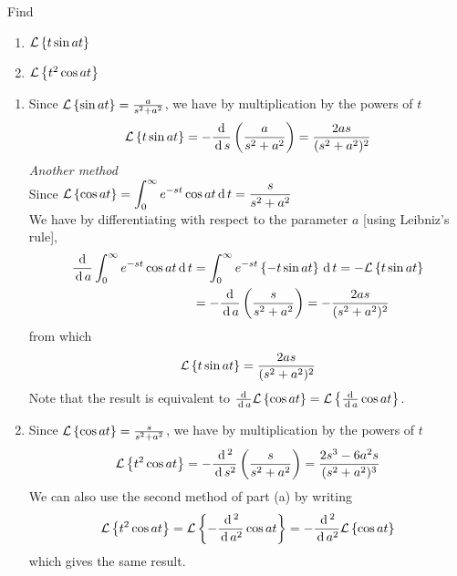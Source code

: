\documentclass[../main-sheet.tex]{subfiles}
\begin{document}
\begin{prob}
    Find \begin{enumerate}[label=(\alph*)]
        \item $ \mathcal{L}\left\{ t\sin at\right\} $
        \item $ \mathcal{L}\left\{ t^2 \cos at\right\} $
    \end{enumerate}
\end{prob}
\begin{soln}
    \hfill
    \begin{enumerate}[label=(\alph*)]
        \item Since $ \mathcal{L}\left\{ \sin at\right\}=\frac{a}{s^2+a^2} $, we have by multiplication by the powers of $ t $
        \[
            \mathcal{L}\left\{ t\sin at\right\}=-\frac{\,\mathrm{d}\,}{\,\mathrm{d}\, s}\left( \frac{a}{s^2+a^2} \right)=\frac{2as}{(s^2+a^2)^2}
        \]
        \emph{Another method}\\
        Since $ \displaystyle \mathcal{L}\left\{ \cos at\right\}=\int_0^\infty e^{-st}\cos at \,\mathrm{d}\, t =\frac{s}{s^2+a^2}$\\
        We have by differentiating with respect to the parameter $ a $ [using Leibniz's rule],
        \begin{align*}
            \frac{\,\mathrm{d}\,}{\,\mathrm{d}\, a}\int_0^\infty e^{-st}\cos at\,\mathrm{d}\, t&=\int_0^\infty e^{-st}\left\{-t\sin at\right\}\,\mathrm{d}\, t=-\mathcal{L}\left\{ t\sin at\right\}\\
            &=-\frac{\,\mathrm{d}\,}{\,\mathrm{d}\, a}\left( \frac{s}{s^2+a^2} \right)=-\frac{2as}{(s^2+a^2)^2}
        \end{align*}
        from which 
        \[
            \mathcal{L}\left\{ t\sin at\right\}=\frac{2as}{(s^2+a^2)^2}
        \]
        Note that the result is equivalent to $ \frac{\,\mathrm{d}\,}{\,\mathrm{d}\, a}\mathcal{L}\left\{ \cos at\right\}=\mathcal{L}\left\{ \frac{\,\mathrm{d}\,}{\,\mathrm{d}\, a}\cos at\right\} $.
        \item Since $ \mathcal{L}\left\{ \cos at\right\}=\frac{s}{s^2+a^2} $, we have by multiplication by the powers of $ t $
        \[
            \mathcal{L}\left\{ t^2\cos at\right\}=-\frac{\,\mathrm{d}\,^2}{\,\mathrm{d}\, s^2}\left( \frac{s}{s^2+a^2} \right)=\frac{2s^3-6a^2s}{(s^2+a^2)^3}
        \]
        We can also use the second method of part (a) by writing
        \[
            \mathcal{L}\left\{ t^2\cos at\right\}=\mathcal{L}\left\{ -\frac{\,\mathrm{d}\,^2}{\,\mathrm{d}\, a^2}\cos at\right\}=-\frac{\,\mathrm{d}\,^2}{\,\mathrm{d}\, a^2}\mathcal{L}\left\{ \cos at\right\}
        \]
        which gives the same result.
    \end{enumerate}
\end{soln}
\end{document}
